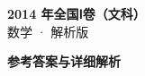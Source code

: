 \documentclass[zihao=-4, a4paper]{ctexart}
\begin{document}
\begin{center}
  {\Large\bfseries 2014 年全国Ⅰ卷（文科）}\\[4pt]
  {\large 数学 · 解析版}
\end{center}
\medskip
{}

\clearpage
{}
\begin{center}{\Large\bfseries 参考答案与详细解析}\end{center}
\medskip

\end{document}
